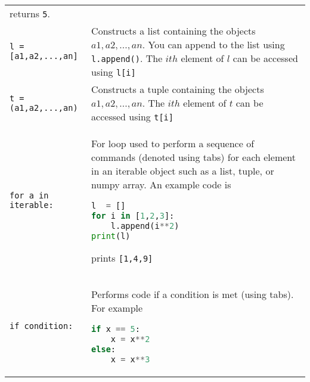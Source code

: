 \documentclass[]{article}
\begin{document}
\begin{longtable}[]{@{}ll@{}}
\begin{minipage}[t]{0.77\columnwidth}
returns \lstinline!5!.\strut
\end{minipage}\tabularnewline
\begin{minipage}[t]{0.17\columnwidth}\raggedright\strut
\lstinline!l = [a1,a2,...,an]!\strut
\end{minipage} & \begin{minipage}[t]{0.77\columnwidth}\raggedright\strut
Constructs a list containing the objects \(a1,a2,...,an\). You can
append to the list using \lstinline!l.append()!. The \(ith\) element of
\(l\) can be accessed using \lstinline!l[i]!\strut
\end{minipage}\tabularnewline
\begin{minipage}[t]{0.17\columnwidth}\raggedright\strut
\lstinline!t =(a1,a2,...,an)!\strut
\end{minipage} & \begin{minipage}[t]{0.77\columnwidth}\raggedright\strut
Constructs a tuple containing the objects \(a1,a2,...,an\). The \(ith\)
element of \(t\) can be accessed using \lstinline!t[i]!\strut
\end{minipage}\tabularnewline
\begin{minipage}[t]{0.17\columnwidth}\raggedright\strut
\lstinline!for a in iterable:!\strut
\end{minipage} & \begin{minipage}[t]{0.77\columnwidth}\raggedright\strut
For loop used to perform a sequence of commands (denoted using tabs) for
each element in an iterable object such as a list, tuple, or numpy
array. An example code is

\begin{lstlisting}[language=Python]
l  = []
for i in [1,2,3]:
    l.append(i**2)
print(l)
\end{lstlisting}

prints \lstinline![1,4,9]!\strut
\end{minipage}\tabularnewline
\begin{minipage}[t]{0.17\columnwidth}\raggedright\strut
\lstinline!if condition:!\strut
\end{minipage} & \begin{minipage}[t]{0.77\columnwidth}\raggedright\strut
Performs code if a condition is met (using tabs). For example

\begin{lstlisting}[language=Python]
if x == 5:
    x = x**2
else:
    x = x**3
\end{lstlisting}


\end{minipage}
\end{longtable}
\end{document}
